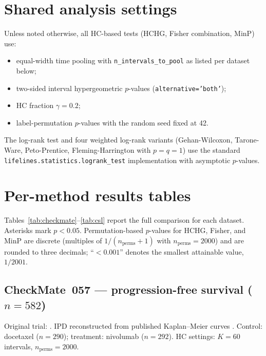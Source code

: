 \documentclass[11pt]{article}
\begin{document}
\section{Shared analysis settings}

Unless noted otherwise, all HC-based tests (HCHG, Fisher combination,
MinP) use:
\begin{itemize}
  \item equal-width time pooling with \texttt{n\_intervals\_to\_pool}
        as listed per dataset below;
  \item two-sided interval hypergeometric $p$-values
        (\texttt{alternative='both'});
  \item HC fraction $\gamma = 0.2$;
  \item label-permutation $p$-values with the random seed fixed at 42.
\end{itemize}

The log-rank test and four weighted log-rank variants (Gehan-Wilcoxon,
Tarone-Ware, Peto-Prentice, Fleming-Harrington with $p=q=1$) use the
standard \texttt{lifelines.statistics.logrank\_test} implementation with
asymptotic $p$-values.

\section{Per-method results tables}

Tables~\ref{tab:checkmate}--\ref{tab:csl} report the full comparison
for each dataset.  Asterisks mark $p < 0.05$.
Permutation-based $p$-values for HCHG, Fisher, and MinP are discrete
(multiples of $1/(n_\mathrm{perms}+1)$ with $n_\mathrm{perms}=2000$) and
are rounded to three decimals; ``$<0.001$'' denotes the smallest
attainable value, $1/2001$.

\subsection*{CheckMate~057 --- progression-free survival ($n=582$)}

Original trial: \citet{borghaei2015}.
IPD reconstructed from published Kaplan--Meier curves
\citep{guyot2012}.
Control: docetaxel ($n=290$); treatment: nivolumab ($n=292$).
HC settings: $K=60$ intervals, $n_\mathrm{perms}=2000$.
\end{document}
